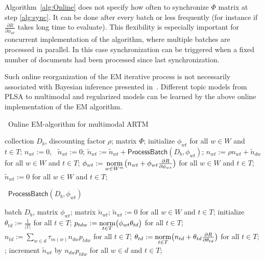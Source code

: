 \documentclass{llncs}
\newcommand{\norm}{\mathop{\rm norm}\limits}
\newcommand{\kw}[1]{\textsf{#1}}
\begin{document}
Algorithm~\ref{alg:Online} does not specify how often to synchronize $\Phi$ matrix at step \ref{alg:sync}.
It can be done after every batch or less frequently
(for instance if $\frac{\partial R}{\partial \phi_{wt}}$ takes long time to evaluate).
This flexibility is especially important for concurrent implementation of the algorithm,
where multiple batches are processed in parallel.
In this case synchronization can be triggered when a fixed number of documents had been processed since last synchronization.

Such online reorganization of the EM iterative process
is not necessarily associated with Bayesian inference presented in~\cite{hoffman10online}.
Different topic models from PLSA to multimodal and regularized models
can be learned by the above online implementation of the EM algorithm.

\begin{algorithm}[t]
\caption{~Online EM-algorithm for multimodal ARTM}
\label{alg:Online}
\begin{algorithmic}[1]
\REQUIRE collection $D_b$, discounting factor $\rho$;
\ENSURE matrix $\Phi$;
\STATE initialize $\phi_{wt}$ for all $w \in W$ and $t \in T$;
\STATE $n_{wt} := 0$,~ $\tilde n_{wt} := 0$;
    \STATE $\tilde n_{wt} := \tilde n_{wt} + \kw{ProcessBatch}(D_b, \phi_{wt})$;
     \label{alg:sync}
        \STATE \label{alg:merging}
               $n_{wt} := \rho n_{wt} + \tilde n_{dw}$ for all $w \in W$ and $t \in T$;
        \STATE \label{alg:phi}
               $\phi_{wt} := \norm_{w\in W^m}
                    \bigl(
                        n_{wt} + \phi_{wt} \frac{\partial R}{\partial \phi_{wt}}
                    \bigr)$ for all $w \in W$ and $t \in T$;
        \STATE $\tilde n_{wt} := 0$ for all $w \in W$ and $t \in T$;
    \ENDIF
\ENDFOR
\end{algorithmic}
\end{algorithm}

\begin{algorithm}[t]
\caption{~$\kw{ProcessBatch} (D_b, \phi_{wt})$}
\label{alg:ProcessBatch}
\begin{algorithmic}[1]
\REQUIRE batch $D_b$, matrix $\phi_{wt}$;
\ENSURE matrix $\tilde n_{wt}$;
\STATE $\tilde n_{wt} := 0$ for all $w \in W$ and $t \in T$;
	\STATE initialize $\theta_{td} := \frac{1}{|T|}$ for all $t \in T$;
	\REPEAT
        \STATE $p_{tdw} := \norm_{t\in T} \bigl(\phi_{wt}\theta_{td}\bigr)$ for all $t \in T$;
        \STATE $n_{td} := \sum_{w\in d} \tau_{m(w)} n_{dw} p_{tdw}$ for all $t \in T$;
        \STATE $\theta_{td} := \norm_{t\in T}
                    \bigl(
                        n_{td} + \theta_{td} \frac{\partial R}{\partial \theta_{td}}
                    \bigr)$ for all $t \in T$;
	;
	\STATE increment $\tilde n_{wt}$ by $n_{dw} p_{tdw}$ for all $w \in d$ and $t \in T$;
\ENDFOR
\end{algorithmic}
\end{algorithm}
\end{document}
